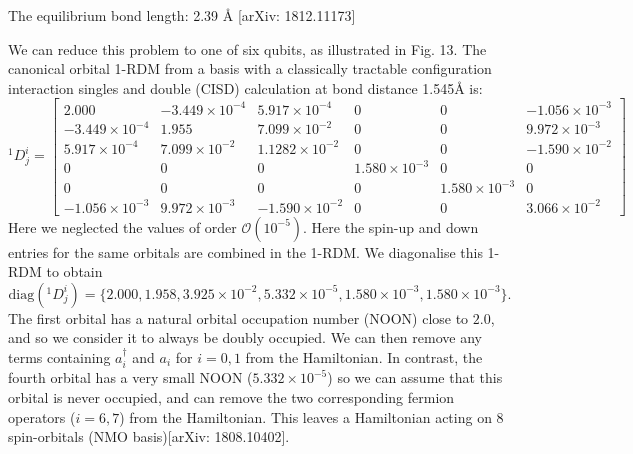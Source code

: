 \documentclass[11pt, oneside]{article}   	%
\begin{document}
The equilibrium bond length: 2.39 \si{\angstrom} [arXiv: 1812.11173]

We can reduce this problem to one of six qubits, as illustrated in Fig. 13. 
The canonical orbital 1-RDM from a basis with a classically tractable configuration interaction singles and double (CISD) calculation at bond distance 1.545\si{\angstrom} is:
\begin{equation}
{}^1 D^i_j = 
\begin{bmatrix}
2.000 & -3.449 \times 10^{-4} & 5.917 \times 10^{-4} & 0 & 0 & -1.056 \times 10^{-3} \\
-3.449 \times 10^{-4} & 1.955 & 7.099 \times 10^{-2} & 0 & 0 & 9.972 \times 10^{-3} \\
5.917 \times 10^{-4} & 7.099 \times 10^{-2} & 1.1282 \times 10^{-2} & 0 & 0 & -1.590 \times 10^{-2} \\
0 & 0 & 0 & 1.580 \times 10^{-3} & 0 & 0 \\
0 & 0 & 0 & 0 &1.580 \times 10^{-3} & 0 \\
-1.056 \times 10^{-3} & 9.972 \times 10^{-3} & -1.590 \times 10^{-2} & 0 & 0 & 3.066 \times 10^{-2}
\end{bmatrix}
\end{equation}
Here we neglected the values of order $\mathcal{O}(10^{-5})$.
Here the spin-up and down entries for the same orbitals are combined in the 1-RDM.
We diagonalise this 1-RDM to obtain 
 \begin{equation}
\mathrm{diag} ({}^1 D^i_j) = \{ 2.000, 1.958, 3.925 \times 10^{-2}, 5.332 \times 10^{-5}, 1.580 \times 10^{-3}, 1.580 \times 10^{-3} \}.
\end{equation}
The first orbital has a natural orbital occupation number (NOON) close to $2.0$, and so we consider it to always be doubly occupied. 
We can then remove any terms containing $a^{\dagger}_i$ and $a_i$ for $i = 0, 1$ from the Hamiltonian. 
In contrast, the fourth orbital has a very small NOON ($5.332 \times 10^{-5}$) so we can assume that this orbital is never occupied, and can remove the two corresponding fermion operators ($i = 6, 7$) from the Hamiltonian. This leaves a Hamiltonian acting on 8 spin-orbitals (NMO basis)[arXiv: 1808.10402]. 
\end{document}
